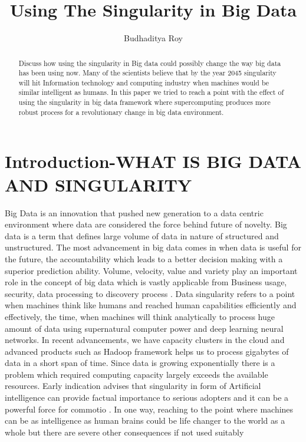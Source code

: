 \documentclass[sigconf]{acmart}
\begin{document}
\title{Using The Singularity in Big Data}


\author{Budhaditya Roy}

\renewcommand{\shortauthors}{B.Roy.}


\begin{abstract}
Discuss how using the singularity in Big data could possibly change the way big data has been using now. Many of the scientists believe that by the year 2045 singularity will hit Information technology and computing industry when machines would be similar intelligent as humans. In this paper we tried to reach a point with the effect of using the singularity in big data framework where supercomputing produces more robust process for a revolutionary change in big data environment. 
\end{abstract}



\maketitle

\section{Introduction-WHAT IS BIG DATA AND SINGULARITY}
Big Data is an innovation that pushed new generation to a data centric environment where data are considered the force behind future of novelty. Big data is a term that defines large volume of data in nature of structured and unstructured. The most advancement in big data comes in when data is useful for the future, the accountability which leads to a better decision making with a superior prediction ability. Volume, velocity, value and variety play an important role in the concept of big data which is vastly applicable from Business usage, security, data processing to discovery process \cite{editor01}. Data singularity refers to a point when machines think like humans and reached human capabilities efficiently and effectively, the time, when machines will think analytically to process huge amount of data using supernatural computer power and deep learning neural networks. In recent advancements, we have capacity clusters in the cloud and advanced products such as Hadoop framework helps us to process gigabytes of data in a short span of time. Since data is growing exponentially there is a problem which required computing capacity largely exceeds the available resources. Early indication advises that singularity in form of Artificial intelligence can provide factual importance to serious adopters and it can be a powerful force for commotio \cite{editor01}. In one way, reaching to the point where machines can be as intelligence as human brains could be life changer to the world as a whole but there are severe other consequences if not used suitably
\end{document}
